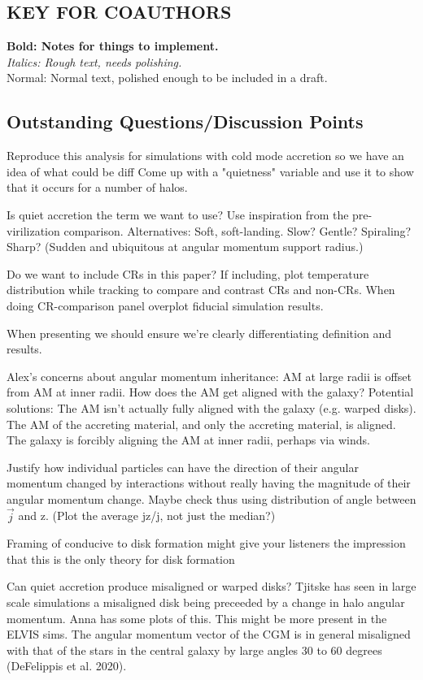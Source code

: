 \documentclass[fleqn,usenatbib]{mnras}
\begin{document}
\subsection{KEY FOR COAUTHORS}
\textbf{Bold: Notes for things to implement.} \\
\textit{Italics: Rough text, needs polishing.} \\
Normal: Normal text, polished enough to be included in a draft.

\subsection{Outstanding Questions/Discussion Points}

Reproduce this analysis for simulations with cold mode accretion so we have an idea of what could be diff
Come up with a "quietness" variable and use it to show that it occurs for a number of halos.

Is quiet accretion the term we want to use?
Use inspiration from the pre-virilization comparison.
Alternatives:
Soft, soft-landing.
Slow?
Gentle?
Spiraling?
Sharp? (Sudden and ubiquitous at angular momentum support radius.)

Do we want to include CRs in this paper?
If including, plot temperature distribution while tracking to compare and contrast CRs and non-CRs.
When doing CR-comparison panel overplot fiducial simulation results.

When presenting we should ensure we're clearly differentiating definition and results.

Alex's concerns about angular momentum inheritance:
AM at large radii is offset from AM at inner radii.
How does the AM get aligned with the galaxy?
Potential solutions:
The AM isn't actually fully aligned with the galaxy (e.g. warped disks).
The AM of the accreting material, and only the accreting material, is aligned.
The galaxy is forcibly aligning the AM at inner radii, perhaps via winds.

Justify how individual particles can have the direction of their angular momentum changed by interactions without really having the magnitude of their angular momentum change.
Maybe check thus using distribution of angle between $\vec{j}$ and z. (Plot the average jz/j, not just the median?)

Framing of conducive to disk formation might give your listeners the impression that this is the only theory for disk formation

Can quiet accretion produce misaligned or warped disks?
Tjitske has seen in large scale simulations a misaligned disk being preceeded by a change in halo angular momentum.
Anna has some plots of this. This might be more present in the ELVIS sims.
The angular momentum vector of the CGM is in general misaligned with that of the stars in the central galaxy by large angles  30 to 60 degrees (DeFelippis et al. 2020).
\end{document}

